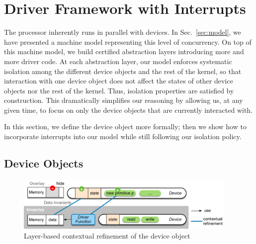 \section{Driver Framework with Interrupts}
\label{sec:driver}

The processor inherently runs in parallel with devices. In Sec.~\ref{sec:model},
we have presented a machine model representing this level of concurrency. On top
of this machine model, we build certified abstraction layers introducing more
and more driver code. At each abstraction layer, our model enforces systematic
isolation among the different device objects and the rest of the kernel, so that
interaction with one device object does not affect the states of other device
objects nor the rest of the kernel. Thus, isolation properties are satisfied by
construction. This dramatically simplifies our reasoning by allowing us, at any
given time, to focus on only the device objects that are currently interacted
with.

In this section, we define the device object more formally; then we show how to
incorporate interrupts into our model while still following our isolation
policy.

\subsection{Device Objects}

\begin{figure}
\begin{center}
\includegraphics[width=0.95\textwidth]{figs/object}
\end{center}
\caption{Layer-based contextual refinement of the device object}
\label{fig:spec:object}
\end{figure}


